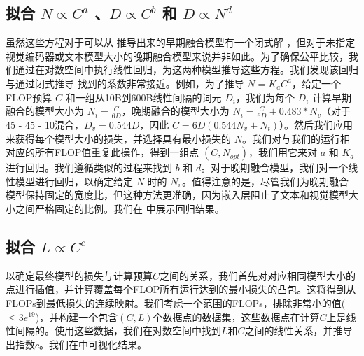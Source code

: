 \subsection{拟合 \(N \propto C^a\) 、\(D \propto C^b\) 和 \(D \propto N^d\) }  
虽然这些方程对于可以从  推导出来的早期融合模型有一个闭式解 \citep{hoffmann2022training}，但对于未指定视觉编码器或文本模型大小的晚期融合模型来说并非如此。为了确保公平比较，我们通过在对数空间中执行线性回归，为这两种模型推导这些方程。我们发现该回归与通过闭式推导  找到的系数非常接近。例如，为了推导 \(N = K_aC^a\)，给定一个FLOP预算 \(C\) 和一组从10B到600B线性间隔的词元 \(D_i\)，我们为每个 \(D_i\) 计算早期融合的模型大小为 \(N_i = \frac{C}{6D}\)，晚期融合的模型大小为 \(N_i = \frac{C}{6D}+0.483*N_v\)（对于45 - 45 - 10混合，\(D_v=0.544D\)，因此 $C=6D(0.544N_v+N_t)$）。然后我们应用  来获得每个模型大小的损失，并选择具有最小损失的 \(N\)。我们对与我们的运行相对应的所有FLOP值重复此操作，得到一组点 \((C, N_{opt})\)，我们用它来对 \(a\) 和 \(K_a\) 进行回归。我们遵循类似的过程来找到 \(b\) 和 \(d\)。对于晚期融合模型，我们对一个线性模型进行回归，以确定给定 \(N\) 时的 \(N_v\)。值得注意的是，尽管我们为晚期融合模型保持固定的宽度比，但这种方法更准确，因为嵌入层阻止了文本和视觉模型大小之间严格固定的比例。我们在  中展示回归结果。


\begin{table}[htb]
    \centering
    \setlength{\tabcolsep}{16pt} %
    \renewcommand{\arraystretch}{1} %
    \caption{\textbf{早融合的缩放参数。} 通过回归推导缩放系数与使用闭式解得到的结果非常接近。}
    \label{tab:scaling_laws_closed_form}
\end{table}


\subsection{拟合 \(L \propto C^c\) }  
以确定最终模型的损失与计算预算\(C\)之间的关系，我们首先对对应相同模型大小的点进行插值，并计算覆盖每个FLOP所有运行达到的最小损失的凸包。这将得到从FLOPs到最低损失的连续映射。我们考虑一个范围的FLOPs，排除非常小的值($\leq 3e^{19}$)，并构建一个包含\((C, L)\)个数据点的数据集，这些数据点在计算\(C\)上是线性间隔的。使用这些数据，我们在对数空间中找到\(L\)和\(C\)之间的线性关系，并推导出指数\(c\)。我们在中可视化结果。









